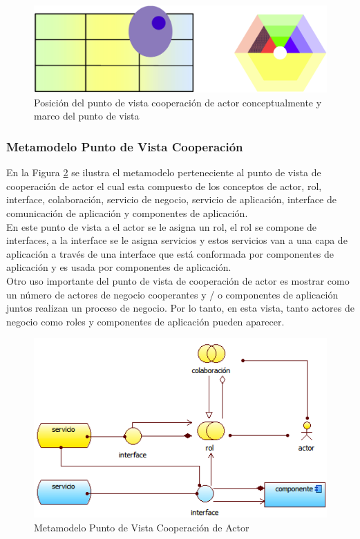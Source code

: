       \begin{figure}[h]
      	\centering
      	\includegraphics[scale=0.2]{Imagenes/Figuras/15.png}
      	\caption{Posición del punto de vista cooperación de actor conceptualmente y marco del punto de vista \cite{ref9}}
      	\label{figura15}
      \end{figure}
      \subsubsection{Metamodelo Punto de Vista Cooperación}
      En la Figura \ref{metamodelo2} se ilustra el metamodelo perteneciente al punto de vista de cooperación de actor el cual esta compuesto de los conceptos de actor, rol, interface, colaboración, servicio de negocio, servicio de aplicación, interface de comunicación de aplicación y componentes de aplicación.\\

      En este punto de vista a el actor se le asigna un rol, el rol se compone de interfaces, a la interface se le asigna servicios y estos servicios van a una capa de aplicación a través de una interface que está conformada por componentes de aplicación y es usada por componentes de aplicación. \\

      Otro uso importante del punto de vista de cooperación de actor es mostrar como un número de actores de negocio cooperantes y / o componentes de aplicación juntos realizan un proceso de negocio. Por lo tanto, en esta vista, tanto actores de negocio como roles y componentes de aplicación pueden aparecer. \cite{ref9}

      \begin{figure}[h]
      	\centering
      	\includegraphics{Imagenes/Metamodelos/02.png}
      	\caption{Metamodelo Punto de Vista Cooperación de Actor \cite{ref9}}
      	\label{metamodelo2}
      \end{figure}
